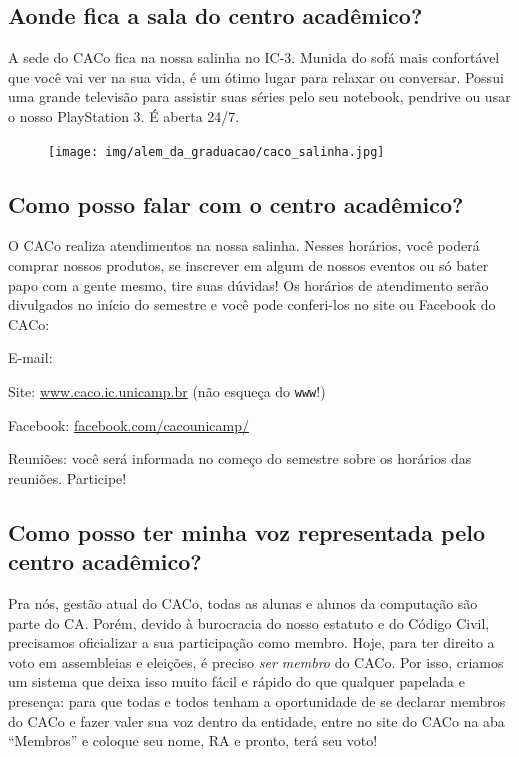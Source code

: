 \subsection{Aonde fica a sala do centro acadêmico?}

A sede do CACo fica na nossa salinha no IC-3. Munida do sofá mais confortável
que você vai ver na sua vida, é um ótimo lugar para relaxar ou conversar.
Possui uma grande televisão para assistir suas séries pelo seu notebook,
pendrive ou usar o nosso PlayStation 3. É aberta 24/7.

\begin{figure}[H]
  \centering
  \texttt{[image: img/alem\_da\_graduacao/caco\_salinha.jpg]}
\end{figure}

\subsection{Como posso falar com o centro acadêmico?}

O CACo realiza atendimentos na nossa salinha. Nesses horários, você poderá
comprar nossos produtos, se inscrever em algum de nossos eventos ou só bater
papo com a gente mesmo, tire suas dúvidas! Os horários de atendimento serão
divulgados no início do semestre e você pode conferi-los no site ou Facebook do
CACo:

\begin{compactitemize}
\item E-mail: 
\item Site: \url{www.caco.ic.unicamp.br} (não esqueça do \texttt{www}!)
\item Facebook: \url{facebook.com/cacounicamp/}
\item Reuniões: você será informada no começo do semestre sobre os horários das
  reuniões. Participe!
\end{compactitemize}

\subsection{Como posso ter minha voz representada pelo centro acadêmico?}

Pra nós, gestão atual do CACo, todas as alunas e alunos da computação são parte
do CA. Porém, devido à burocracia do nosso estatuto e do Código Civil,
precisamos oficializar a sua participação como membro. Hoje, para ter direito a
voto em assembleias e eleições, é preciso \emph{ser membro} do CACo. Por isso,
criamos um sistema que deixa isso muito fácil e rápido do que qualquer papelada
e presença: para que todas e todos tenham a oportunidade de se declarar membros
do CACo e fazer valer sua voz dentro da entidade, entre no site do CACo na aba
``Membros'' e coloque seu nome, RA e pronto, terá seu voto!

